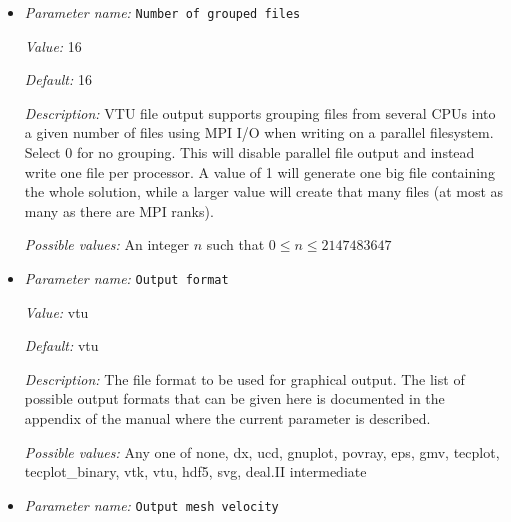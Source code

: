 \begin{itemize}
{\it Possible values:} A comma-separated list of any of ISA rotation timescale, Vp anomaly, Vs anomaly, adiabat, artificial viscosity, artificial viscosity composition, boundary indicators, compositional vector, density, depth, dynamic topography, error indicator, geoid, grain lag angle, gravity, heat flux map, heating, material properties, maximum horizontal compressive stress, melt fraction, melt material properties, named additional outputs, nonadiabatic pressure, nonadiabatic temperature, particle count, partition, shear stress, spd factor, specific heat, strain rate, stress, temperature anomaly, thermal conductivity, thermal diffusivity, thermal expansivity, vertical heat flux, viscosity, volumetric strain rate
\item {\it Parameter name:} {\tt Number of grouped files}
\label{parameters:Postprocess/Visualization/Number of grouped files}


{\it Value:} 16


{\it Default:} 16


{\it Description:} VTU file output supports grouping files from several CPUs into a given number of files using MPI I/O when writing on a parallel filesystem. Select 0 for no grouping. This will disable parallel file output and instead write one file per processor. A value of 1 will generate one big file containing the whole solution, while a larger value will create that many files (at most as many as there are MPI ranks).


{\it Possible values:} An integer $n$ such that $0\leq n \leq 2147483647$
\item {\it Parameter name:} {\tt Output format}
\label{parameters:Postprocess/Visualization/Output format}


{\it Value:} vtu


{\it Default:} vtu


{\it Description:} The file format to be used for graphical output. The list of possible output formats that can be given here is documented in the appendix of the manual where the current parameter is described.


{\it Possible values:} Any one of none, dx, ucd, gnuplot, povray, eps, gmv, tecplot, tecplot\_binary, vtk, vtu, hdf5, svg, deal.II intermediate
\item {\it Parameter name:} {\tt Output mesh velocity}
\label{parameters:Postprocess/Visualization/Output mesh velocity}



\end{itemize}
